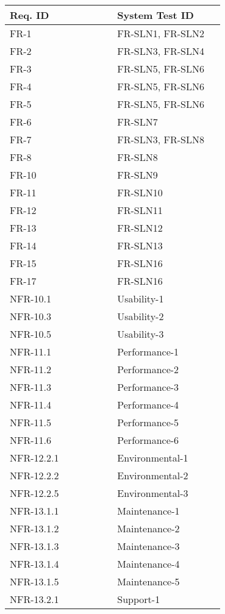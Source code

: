 \documentclass[12pt, titlepage]{article}
\begin{document}
\begin{longtable}{|p{0.45\linewidth}|p{0.45\linewidth}|}
\hline
\textbf{Req. ID} & \textbf{System Test ID} \\
\hline
FR-1 & FR-SLN1, FR-SLN2 \\
\hline
FR-2 & FR-SLN3, FR-SLN4 \\
\hline
FR-3 & FR-SLN5, FR-SLN6 \\
\hline
FR-4 & FR-SLN5, FR-SLN6 \\
\hline
FR-5 & FR-SLN5, FR-SLN6 \\
\hline
FR-6 & FR-SLN7 \\
\hline
FR-7 & FR-SLN3, FR-SLN8 \\
\hline
FR-8 & FR-SLN8 \\
\hline
FR-10 & FR-SLN9 \\
\hline
FR-11 & FR-SLN10 \\
\hline
FR-12 & FR-SLN11 \\
\hline
FR-13 & FR-SLN12 \\
\hline
FR-14 & FR-SLN13 \\
\hline
FR-15 & FR-SLN16 \\
\hline
FR-17 & FR-SLN16 \\
\hline
NFR-10.1 & Usability-1  \\
\hline
NFR-10.3 & Usability-2 \\
\hline
NFR-10.5 & Usability-3 \\
\hline
NFR-11.1 & Performance-1 \\
\hline
NFR-11.2 & Performance-2 \\
\hline
NFR-11.3 & Performance-3 \\
\hline
NFR-11.4 & Performance-4 \\
\hline
NFR-11.5 & Performance-5 \\
\hline
NFR-11.6 & Performance-6 \\
\hline
NFR-12.2.1 & Environmental-1 \\
\hline
NFR-12.2.2 & Environmental-2 \\
\hline
NFR-12.2.5 & Environmental-3 \\
\hline
NFR-13.1.1 & Maintenance-1 \\
\hline
NFR-13.1.2 & Maintenance-2 \\
\hline
NFR-13.1.3 & Maintenance-3 \\
\hline
NFR-13.1.4 & Maintenance-4 \\
\hline
NFR-13.1.5 & Maintenance-5 \\
\hline
NFR-13.2.1 & Support-1 \\
\hline

\end{longtable}
\end{document}
